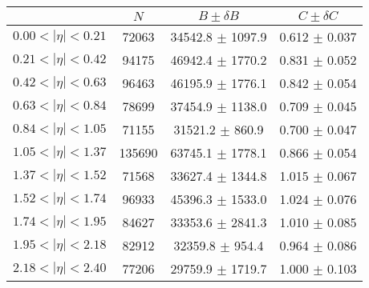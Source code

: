 \begin{tabular}{lccc}
\hline
    &   $N$   & $B \pm \delta B$  &  $C \pm \delta C$ \\
\hline
$0.00 < |\eta| <0.21$          & 72063      & 34542.8    $\pm$ 1097.9 & 0.612      $\pm$ 0.037 \\
$0.21 < |\eta| <0.42$          & 94175      & 46942.4    $\pm$ 1770.2 & 0.831      $\pm$ 0.052 \\
$0.42 < |\eta| <0.63$          & 96463      & 46195.9    $\pm$ 1776.1 & 0.842      $\pm$ 0.054 \\
$0.63 < |\eta| <0.84$          & 78699      & 37454.9    $\pm$ 1138.0 & 0.709      $\pm$ 0.045 \\
$0.84 < |\eta| <1.05$          & 71155      & 31521.2    $\pm$ 860.9 & 0.700      $\pm$ 0.047 \\
$1.05 < |\eta| <1.37$          & 135690     & 63745.1    $\pm$ 1778.1 & 0.866      $\pm$ 0.054 \\
$1.37 < |\eta| <1.52$          & 71568      & 33627.4    $\pm$ 1344.8 & 1.015      $\pm$ 0.067 \\
$1.52 < |\eta| <1.74$          & 96933      & 45396.3    $\pm$ 1533.0 & 1.024      $\pm$ 0.076 \\
$1.74 < |\eta| <1.95$          & 84627      & 33353.6    $\pm$ 2841.3 & 1.010      $\pm$ 0.085 \\
$1.95 < |\eta| <2.18$          & 82912      & 32359.8    $\pm$ 954.4 & 0.964      $\pm$ 0.086 \\
$2.18 < |\eta| <2.40$          & 77206      & 29759.9    $\pm$ 1719.7 & 1.000      $\pm$ 0.103 \\
\hline
\end{tabular}
